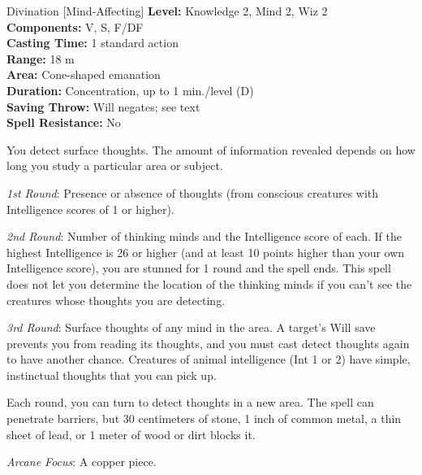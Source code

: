 {Divination [Mind-Affecting]}
{
	\textbf{Level:}
	Knowledge 2, Mind 2, Wiz 2\\
	\textbf{Components:}
	V, S, F/DF\\
	\textbf{Casting Time:}
	1 standard action\\
	\textbf{Range:}
	18 m\\
	\textbf{Area:}
	Cone-shaped emanation\\
	\textbf{Duration:}
	Concentration, up to 1 min./level (D)\\
	\textbf{Saving Throw:}
	Will negates; see text\\
	\textbf{Spell Resistance:}
	No\\
}
{
	You detect surface thoughts. The amount of information revealed depends on how long you study a particular area or subject.

	\textit{1st Round}:
	Presence or absence of thoughts (from conscious creatures with Intelligence scores of 1 or higher).

	\textit{2nd Round}:
	Number of thinking minds and the Intelligence score of each. If the highest Intelligence is 26 or higher (and at least 10 points higher than your own Intelligence score), you are stunned for 1 round and the spell ends. This spell does not let you determine the location of the thinking minds if you can't see the creatures whose thoughts you are detecting.

	\textit{3rd Round}:
	Surface thoughts of any mind in the area. A target's Will save prevents you from reading its thoughts, and you must cast detect thoughts again to have another chance. Creatures of animal intelligence (Int 1 or 2) have simple, instinctual thoughts that you can pick up.

	Each round, you can turn to detect thoughts in a new area. The spell can penetrate barriers, but 30 centimeters of stone, 1 inch of common metal, a thin sheet of lead, or 1 meter of wood or dirt blocks it.

	\textit{Arcane Focus}:
	A copper piece.

}
